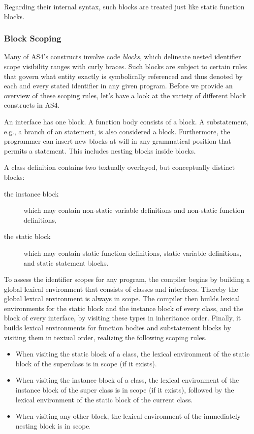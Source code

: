 Regarding their internal syntax, such blocks are treated just
like static function blocks.

\subsubsection{Block Scoping}
Many of AS4's constructs involve code {\em blocks}, which delineate nested identifier scope visibility ranges with
curly braces. Such blocks are subject to certain rules that govern what entity exactly is symbolically referenced and
thus denoted by each and every stated identifier in any given program. Before we provide an overview of these scoping
rules, let's have a look at the variety of different block constructs in AS4.

An interface has one block. A function body consists of a block. A substatement, e.g., a branch of an
 statement, is also considered a block. Furthermore, the programmer can insert new blocks at will in any
grammatical position that permits a statement. This includes nesting blocks inside blocks.

A class definition contains two textually overlayed, but conceptually distinct blocks:
\begin{description}
\item[the instance block] which may contain non-static variable definitions and non-static function definitions,
\item[the static block] which may contain static function definitions, static variable definitions, and static
statement blocks.
\end{description}

To assess the identifier scopes for any program, the compiler begins by building a global lexical environment that
consists of classes and interfaces. Thereby the global lexical environment is always in scope.
The compiler then builds lexical environments for the static block and the instance block of every class, and the block
of every interface, by visiting these types in inheritance order. Finally, it builds lexical environments for function
bodies and substatement blocks by visiting them in textual order, realizing the following scoping rules.
\begin{itemize}
\item When visiting the static block of a class, the lexical environment of the
static block of the superclass is in scope (if it exists).
\item When visiting the instance block of a class,  the lexical environment of the
instance block of the super class is in scope (if it exists), followed by
the lexical environment of the static block of the current class.
\item When visiting any other block, the lexical environment of the
immediately nesting block is in scope.
\end{itemize}


